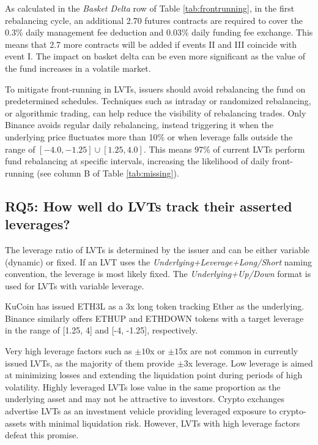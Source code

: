 \begin{example}
	As calculated in the \textsl{Basket Delta} row of Table \ref{tab:frontrunning}, in the first rebalancing cycle, an additional 2.70 futures contracts are required to cover the 0.3\% daily management fee deduction and 0.03\% daily funding fee exchange. This means that 2.7 more contracts will be added if events II and III coincide with event I. The impact on basket delta can be even more significant as the value of the fund increases in a volatile market.
\end{example}

To mitigate front-running in LVTs, issuers should avoid rebalancing the fund on predetermined schedules. Techniques such as intraday or randomized rebalancing, or algorithmic trading, can help reduce the visibility of rebalancing trades. Only Binance avoids regular daily rebalancing, instead triggering it when the underlying price fluctuates more than 10\% or when leverage falls outside the range of $\left[-4.0, -1.25 \right] \cup \left[ 1.25, 4.0 \right]$. This means 97\% of current LVTs perform fund rebalancing at specific intervals, increasing the likelihood of daily front-running (see column B of Table \ref{tab:missing}).

\subsection{RQ5: How well do LVTs track their asserted leverages?}\label{subsec:deviation}
The leverage ratio of LVTs is determined by the issuer and can be either variable (dynamic) or fixed. If an LVT uses the \textsl{Underlying+Leverage+Long/Short} naming convention, the leverage is most likely fixed. The \textsl{Underlying+Up/Down} format is used for LVTs with variable leverage.
\begin{example}
	KuCoin has issued ETH3L as a 3x long token tracking Ether as the underlying. Binance similarly offers ETHUP and ETHDOWN tokens with a target leverage in the range of [1.25, 4] and [-4, -1.25], respectively.
\end{example}

Very high leverage factors such as $\pm10$x or $\pm15$x are not common in currently issued LVTs, as the majority of them provide $\pm3$x leverage. Low leverage is aimed at minimizing losses and extending the liquidation point during periods of high volatility. Highly leveraged LVTs lose value in the same proportion as the underlying asset and may not be attractive to investors. Crypto exchanges advertise LVTs as an investment vehicle providing leveraged exposure to crypto-assets with minimal liquidation risk. However, LVTs with high leverage factors defeat this promise.

